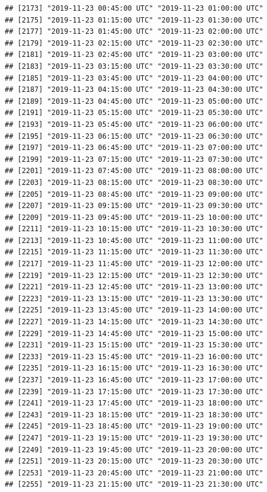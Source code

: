 \documentclass{article}\usepackage[]{graphicx}\usepackage[]{color}
\makeatletter
\newenvironment{kframe}{%
 \def\at@end@of@kframe{}%
 \ifinner\ifhmode%
  \def\at@end@of@kframe{\end{minipage}}%
  \begin{minipage}{\columnwidth}%
 \fi\fi%
 \def\FrameCommand##1{\hskip\@totalleftmargin \hskip-\fboxsep
 \colorbox{shadecolor}{##1}\hskip-\fboxsep
     \hskip-\linewidth \hskip-\@totalleftmargin \hskip\columnwidth}%
 \MakeFramed {\advance\hsize-\width
   \@totalleftmargin\z@ \linewidth\hsize
   \@setminipage}}%
 {\par\unskip\endMakeFramed%
 \at@end@of@kframe}
\newenvironment{knitrout}{}{} %
\makeatother
\begin{document}
\begin{knitrout}
\begin{kframe}
\begin{verbatim}
## [2173] "2019-11-23 00:45:00 UTC" "2019-11-23 01:00:00 UTC"
## [2175] "2019-11-23 01:15:00 UTC" "2019-11-23 01:30:00 UTC"
## [2177] "2019-11-23 01:45:00 UTC" "2019-11-23 02:00:00 UTC"
## [2179] "2019-11-23 02:15:00 UTC" "2019-11-23 02:30:00 UTC"
## [2181] "2019-11-23 02:45:00 UTC" "2019-11-23 03:00:00 UTC"
## [2183] "2019-11-23 03:15:00 UTC" "2019-11-23 03:30:00 UTC"
## [2185] "2019-11-23 03:45:00 UTC" "2019-11-23 04:00:00 UTC"
## [2187] "2019-11-23 04:15:00 UTC" "2019-11-23 04:30:00 UTC"
## [2189] "2019-11-23 04:45:00 UTC" "2019-11-23 05:00:00 UTC"
## [2191] "2019-11-23 05:15:00 UTC" "2019-11-23 05:30:00 UTC"
## [2193] "2019-11-23 05:45:00 UTC" "2019-11-23 06:00:00 UTC"
## [2195] "2019-11-23 06:15:00 UTC" "2019-11-23 06:30:00 UTC"
## [2197] "2019-11-23 06:45:00 UTC" "2019-11-23 07:00:00 UTC"
## [2199] "2019-11-23 07:15:00 UTC" "2019-11-23 07:30:00 UTC"
## [2201] "2019-11-23 07:45:00 UTC" "2019-11-23 08:00:00 UTC"
## [2203] "2019-11-23 08:15:00 UTC" "2019-11-23 08:30:00 UTC"
## [2205] "2019-11-23 08:45:00 UTC" "2019-11-23 09:00:00 UTC"
## [2207] "2019-11-23 09:15:00 UTC" "2019-11-23 09:30:00 UTC"
## [2209] "2019-11-23 09:45:00 UTC" "2019-11-23 10:00:00 UTC"
## [2211] "2019-11-23 10:15:00 UTC" "2019-11-23 10:30:00 UTC"
## [2213] "2019-11-23 10:45:00 UTC" "2019-11-23 11:00:00 UTC"
## [2215] "2019-11-23 11:15:00 UTC" "2019-11-23 11:30:00 UTC"
## [2217] "2019-11-23 11:45:00 UTC" "2019-11-23 12:00:00 UTC"
## [2219] "2019-11-23 12:15:00 UTC" "2019-11-23 12:30:00 UTC"
## [2221] "2019-11-23 12:45:00 UTC" "2019-11-23 13:00:00 UTC"
## [2223] "2019-11-23 13:15:00 UTC" "2019-11-23 13:30:00 UTC"
## [2225] "2019-11-23 13:45:00 UTC" "2019-11-23 14:00:00 UTC"
## [2227] "2019-11-23 14:15:00 UTC" "2019-11-23 14:30:00 UTC"
## [2229] "2019-11-23 14:45:00 UTC" "2019-11-23 15:00:00 UTC"
## [2231] "2019-11-23 15:15:00 UTC" "2019-11-23 15:30:00 UTC"
## [2233] "2019-11-23 15:45:00 UTC" "2019-11-23 16:00:00 UTC"
## [2235] "2019-11-23 16:15:00 UTC" "2019-11-23 16:30:00 UTC"
## [2237] "2019-11-23 16:45:00 UTC" "2019-11-23 17:00:00 UTC"
## [2239] "2019-11-23 17:15:00 UTC" "2019-11-23 17:30:00 UTC"
## [2241] "2019-11-23 17:45:00 UTC" "2019-11-23 18:00:00 UTC"
## [2243] "2019-11-23 18:15:00 UTC" "2019-11-23 18:30:00 UTC"
## [2245] "2019-11-23 18:45:00 UTC" "2019-11-23 19:00:00 UTC"
## [2247] "2019-11-23 19:15:00 UTC" "2019-11-23 19:30:00 UTC"
## [2249] "2019-11-23 19:45:00 UTC" "2019-11-23 20:00:00 UTC"
## [2251] "2019-11-23 20:15:00 UTC" "2019-11-23 20:30:00 UTC"
## [2253] "2019-11-23 20:45:00 UTC" "2019-11-23 21:00:00 UTC"
## [2255] "2019-11-23 21:15:00 UTC" "2019-11-23 21:30:00 UTC"

\end{verbatim}
\end{kframe}
\end{knitrout}
\end{document}
